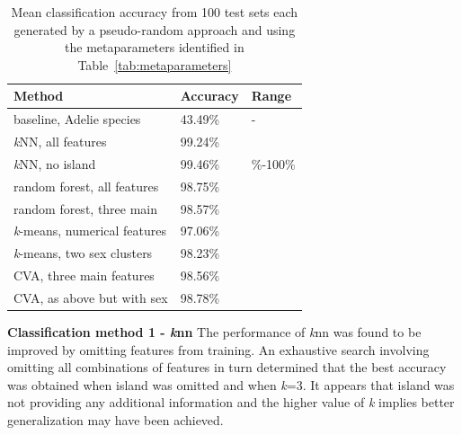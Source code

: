 \documentclass[12pt]{article}
\begin{document}
\begin{table} %
  \small
  \centering
  \vspace{-3\baselineskip} %
  \setlength{\abovecaptionskip}{5pt}
  \setlength{\belowcaptionskip}{5pt}
  \fontsize{10}{10}\selectfont %
  \begin{tabular}{@{}lp{1.5cm}>{\centering\arraybackslash}p{2.2cm}@{}}
  \toprule
  \textbf{Method} & \textbf{Accuracy} & \textbf{Range}\\
  \midrule
  baseline, Adelie species & 43.49\% & - \\
  \midrule
  \textit{k}NN, all features    & 99.24\% &  \\
  \textit{k}NN, no island &   99.46\% & 97.08\%-100\% \\
  \midrule
  random forest, all features    & 98.75\% &  \\
  random forest, three main   & 98.57\% &  \\
  \midrule
  \textit{k}-means, numerical features & 97.06\% &  \\
  \textit{k}-means, two sex clusters  & 98.23\% &  \\
  \midrule
  CVA, three main features & 98.56\% &  \\
  CVA, as above but with sex & 98.78\% &  \\
  \bottomrule
  \end{tabular}
  \vspace{-2\baselineskip} %
  \caption{Mean classification accuracy from 100 test sets each generated by a pseudo-random approach 
  and using the metaparameters identified in Table~\ref{tab:metaparameters}}
  \vspace{-1\baselineskip} %
  \label{tab:results}
\end{table}

\textbf{Classification method 1 - \textit{k}nn}  
The performance of \textit{k}nn was found to be improved by omitting features from training. 
An exhaustive search involving omitting all combinations of features in turn determined that the best accuracy was obtained 
when island was omitted and when \textit{k}=3. It appears that island was not providing any additional information 
and the higher value of \textit{k} implies better generalization may have been achieved.
\end{document}

